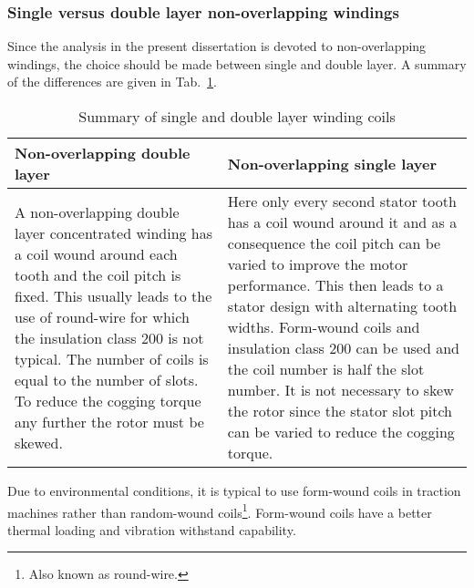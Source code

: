 \subsubsection{Single versus double layer non-overlapping windings}
Since the analysis in the present dissertation is devoted to non-overlapping windings, the choice should be made between single and double layer. A summary of the differences are given in Tab.~\ref{tab:single_vs_double_2}.
\begin{table}[htbp]
\caption{Summary of single and double layer winding coils}
\begin{tabularx}{\textwidth}{XX}
\toprule
\textbf{Non-overlapping double layer}&\textbf{Non-overlapping single layer}\\\toprule 
A non-overlapping double layer concentrated winding has a coil wound around each tooth and the coil pitch is fixed.  This usually leads to the use of round-wire for which the insulation class \num{200} is not typical. The number of coils is equal to the number of slots. To reduce the cogging torque any further the rotor must be skewed. &
Here only every second stator tooth has a coil wound around it and as a consequence the coil pitch can be varied to improve the motor performance. This then leads to a stator design with alternating tooth widths. Form-wound coils and insulation class \num{200} can be used and the coil number is half the slot number. It is not necessary to skew the rotor since the stator slot pitch can be varied to reduce the cogging torque.
\\\bottomrule
\end{tabularx}
\label{tab:single_vs_double_2}
\end{table}

Due to environmental conditions, it is typical to use form-wound coils in traction machines rather than random-wound coils\footnote{Also known as round-wire.}. Form-wound coils have a better thermal loading and vibration withstand capability. 

